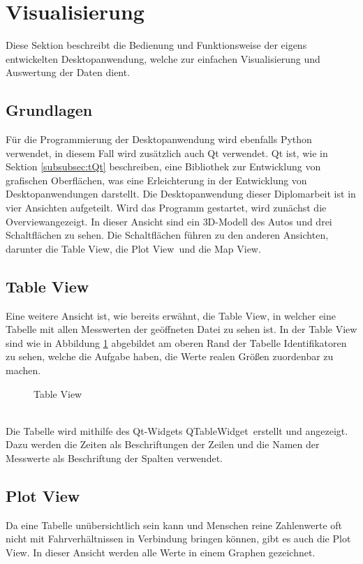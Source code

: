 \section{Visualisierung}
\label{sec:DesktopApp}
Diese Sektion beschreibt die Bedienung und Funktionsweise der eigens entwickelten Desktopanwendung, welche zur einfachen Visualisierung und Auswertung der Daten dient.
\subsection{Grundlagen}
\label{subsec:VisGrundlagen}
Für die Programmierung der Desktopanwendung wird ebenfalls Python verwendet, in diesem Fall wird zusätzlich auch Qt verwendet. Qt ist, wie in Sektion \ref{subsubsec:tQt} beschreiben, eine Bibliothek zur Entwicklung von grafischen Oberflächen, was eine Erleichterung in der Entwicklung von Desktopanwendungen darstellt. Die Desktopanwendung dieser Diplomarbeit ist in vier Ansichten aufgeteilt. Wird das Programm gestartet, wird zunächst die \glqq Overview\grqq angezeigt. In dieser Ansicht sind ein \ac{3D}-Modell des Autos und drei Schaltflächen zu sehen. Die Schaltflächen führen zu den anderen Ansichten, darunter die \glqq Table View\grqq , die \glqq Plot View\grqq \ und die \glqq Map View\grqq .
\subsection{Table View}
\label{subsec:VisTableView}
Eine weitere Ansicht ist, wie bereits erwähnt, die \glqq Table View\grqq , in welcher eine Tabelle mit allen Messwerten der geöffneten Datei zu sehen ist. In der Table View sind wie in Abbildung \ref{fig:TableView} abgebildet am oberen Rand der Tabelle Identifikatoren zu sehen, welche die Aufgabe haben, die Werte realen Größen zuordenbar zu machen.
\begin{figure}[h]
\centering
\missingfigure{}
\caption{Table View}
\label{fig:TableView}
\end{figure}
\\
Die Tabelle wird mithilfe des Qt-Widgets \glqq QTableWidget\grqq\ erstellt und angezeigt. Dazu werden die Zeiten als Beschriftungen der Zeilen und die Namen der Messwerte als Beschriftung der Spalten verwendet. 

\subsection{Plot View}
\label{subsec:VisPlotView}
Da eine Tabelle unübersichtlich sein kann und Menschen reine Zahlenwerte oft nicht mit Fahrverhältnissen in Verbindung bringen können, gibt es auch die \glqq Plot View\grqq . In dieser Ansicht werden alle Werte in einem Graphen gezeichnet.
